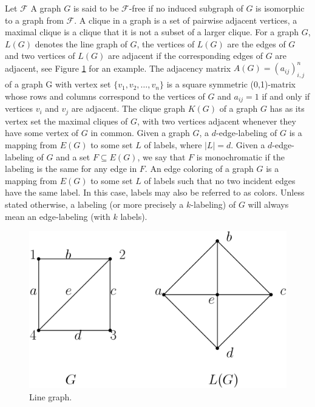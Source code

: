 \documentclass[12pt,a4paper,titlepage,openany]{report}
\begin{document}
Let $\mathcal{F}$ A graph $G$ is said to be $\mathcal{F}$-free if no induced subgraph of $G$ is isomorphic to a graph from $\mathcal{F}$. A clique in a graph is a set of pairwise adjacent vertices, a maximal clique is a clique that it is not a subset of a larger clique. For a graph $G$, $L(G)$ denotes the line graph of $G$, the vertices of $L(G)$ are the edges of $G$ and two vertices of $L(G)$ are adjacent if the corresponding edges of $G$ are adjacent, see Figure \ref{linegraph} for an example. The adjacency matrix $A(G)=(a_{ij})_{i,j}^n$ of a graph G with vertex set $\{ v_1,v_2,\ldots, v_n\}$ is a square symmetric (0,1)-matrix whose rows and columns correspond to the vertices of $G$ and $a_{ij} = 1$ if and only if vertices $v_i$ and $v_j$ are adjacent. The clique graph $K(G)$ of a graph $G$ has as its vertex set the maximal cliques of $G$, with two vertices adjacent whenever they have some vertex of $G$ in common.\newline
Given a graph $G$, a $d$-edge-labeling of $G$ is a mapping from $E(G)$ to some set $L$ of labels, where $|L| = d$. Given a $d$-edge-labeling of $G$ and a set $F \subseteq E(G)$,
we say that $F$ is monochromatic if the labeling is the same for any edge in $F$. An edge coloring of a graph $G$ is a mapping from $E(G)$ to some set $L$ of labels such that no two incident edges have the same label. In this case, labels may also be referred to as colors.  Unless stated otherwise, a labeling (or more precisely a $k$-labeling) of $G$ will always mean an edge-labeling (with $k$ labels).

\begin{figure}[h]
\begin{center}
\includegraphics[width=0.7\linewidth]{figures/linegraph.png}
\end{center}
\caption{Line graph.}\label{linegraph}
\end{figure}
\end{document}

